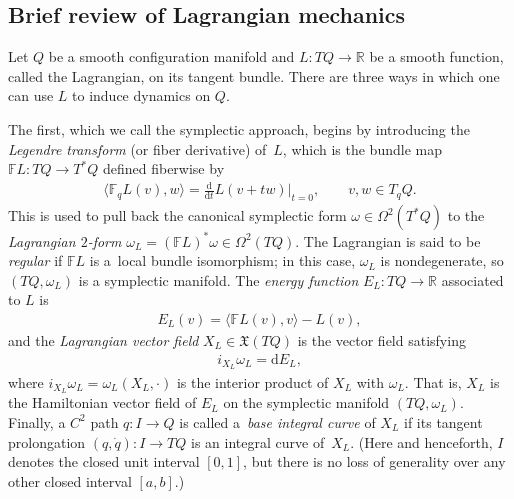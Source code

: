 \documentclass[10pt,a4paper]{amsart}
\numberwithin{equation}{section}
\begin{document}
\subsection{Brief review of Lagrangian mechanics}\label{sec:review}

Let $Q$ be a smooth conf\/iguration manifold and $ L \colon T Q \rightarrow \mathbb{R} $ be a smooth function, called the Lagrangian, on its tangent bundle. There are three ways in which one can use $L$ to induce dynamics on $Q$.

The f\/irst, which we call the symplectic approach, begins by introducing the \emph{Legendre transform} (or f\/iber derivative) of~$L$, which is the bundle map $ \mathbb{F} L \colon T Q \rightarrow T ^\ast Q $ def\/ined f\/iberwise by
\begin{gather*}
 \bigl\langle \mathbb{F} _q L (v) , w \bigr\rangle = \frac{\mathrm{d}}{\mathrm{d}t} L ( v + t w ) \Bigr\rvert _{ t = 0 }, \qquad v, w \in T _q Q .
\end{gather*}
This is used to pull back the canonical symplectic form $ \omega \in \Omega ^2 ( T ^\ast Q ) $ to the \emph{Lagrangian $2$-form} $ \omega _L = ( \mathbb{F} L ) ^\ast \omega \in \Omega ^2 ( T Q ) $. The Lagrangian is said to be \emph{regular} if $ \mathbb{F} L $ is a~local bundle isomorphism; in this case, $ \omega _L $ is nondegenerate, so $ ( T Q , \omega _L ) $ is a symplectic manifold. The \emph{energy function} $ E _L \colon T Q \rightarrow \mathbb{R} $ associated to $L$ is
\begin{gather*}
 E _L (v) = \bigl\langle \mathbb{F} L (v) , v \bigr\rangle - L (v) ,
\end{gather*}
and the \emph{Lagrangian vector field} $ X _L \in \mathfrak{X} ( T Q ) $ is the vector f\/ield satisfying
\begin{gather*}
 i _{ X _L } \omega _L = \mathrm{d} E _L ,
\end{gather*}
where $ i _{ X _L } \omega _L = \omega _L ( X _L , \cdot ) $ is the interior product of $ X _L $ with $ \omega _L $. That is, $ X _L $ is the Hamiltonian vector f\/ield of $ E _L $ on the symplectic manifold $ ( T Q, \omega _L ) $. Finally, a $ C ^2 $ path $ q \colon I \rightarrow Q $ is called a~\emph{base integral curve} of $ X _L $ if its tangent prolongation $ ( q, \dot{q} ) \colon I \rightarrow T Q $ is an integral curve of~$ X _L $. (Here and henceforth, $I$ denotes the closed unit interval $ [0,1] $, but there is no loss of generality over any other closed interval $[a,b]$.)
\end{document}

